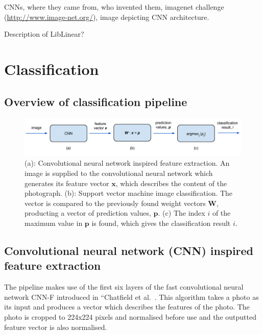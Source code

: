 \documentclass[11pt, a4paper]{report}
\newcommand{\vect}[1]{\boldsymbol{#1}}
\begin{document}
CNNs, where they came from, who invented them, imagenet challenge (\url{http://www.image-net.org/}), image depicting CNN architecture. 


Description of LibLinear?












\chapter{Classification}

\section{Overview of classification pipeline}

\begin{figure}[hbt]
	\centering
  \includegraphics[totalheight=3cm]{img/08.png}
  \caption{(a): Convolutional neural network inspired feature extraction. An image is supplied to the convolutional neural network which generates its feature vector $\vect{x}$, which describes the content of the photograph. (b): Support vector machine image classification. The vector is compared to the previously found weight vectors $\vect{W}$, producting a vector of prediction values, $\vect{p}$. (c) The index $i$ of the maximum value in $\vect{p}$ is found, which gives the classification result $i$.}
  \label{img:08}
\end{figure}


\section{Convolutional neural network (CNN) inspired feature extraction}

The pipeline makes use of the first six layers of the fast convolutional neural network CNN-F introduced in “Chatfield et al.~\cite{Chatfield14}. This algorithm takes a photo as its input and produces a vector which describes the features of the photo. The photo is cropped to 224x224 pixels and normalised before use and the outputted feature vector is also normalised.
\end{document}
